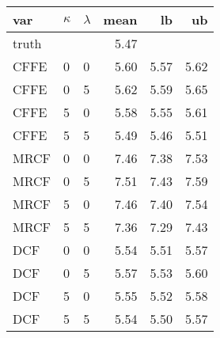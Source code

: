 \begin{tabular}{lllrrr}
  \hline
var & $\kappa$ & $\lambda$ & mean & lb & ub \\ 
  \hline
truth &  &  & 5.47 &  &  \\ 
  CFFE  & 0 & 0 & 5.60 & 5.57 & 5.62 \\ 
  CFFE  & 0 & 5 & 5.62 & 5.59 & 5.65 \\ 
  CFFE  & 5 & 0 & 5.58 & 5.55 & 5.61 \\ 
  CFFE  & 5 & 5 & 5.49 & 5.46 & 5.51 \\ 
  MRCF  & 0 & 0 & 7.46 & 7.38 & 7.53 \\ 
  MRCF  & 0 & 5 & 7.51 & 7.43 & 7.59 \\ 
  MRCF  & 5 & 0 & 7.46 & 7.40 & 7.54 \\ 
  MRCF  & 5 & 5 & 7.36 & 7.29 & 7.43 \\ 
  DCF  & 0 & 0 & 5.54 & 5.51 & 5.57 \\ 
  DCF  & 0 & 5 & 5.57 & 5.53 & 5.60 \\ 
  DCF  & 5 & 0 & 5.55 & 5.52 & 5.58 \\ 
  DCF  & 5 & 5 & 5.54 & 5.50 & 5.57 \\ 
   \hline
\end{tabular}
